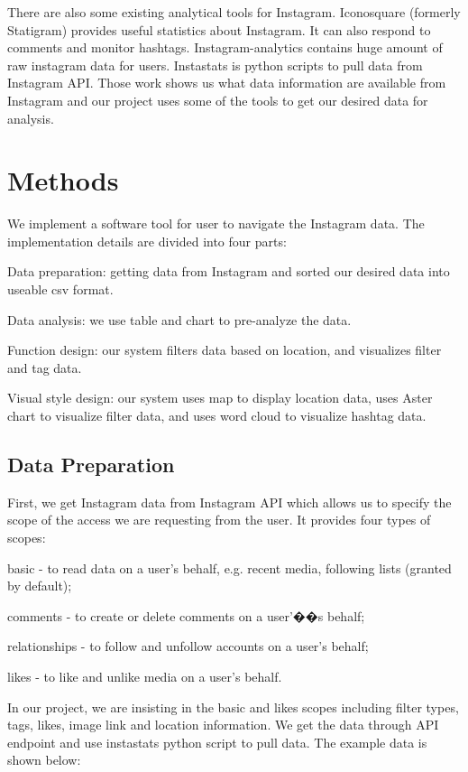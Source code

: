 \documentclass[conference]{acmsiggraph}
\begin{document}
There are also some existing analytical tools for Instagram. Iconosquare (formerly Statigram) \cite{iconosquare} provides useful statistics about Instagram. It can also respond to comments and monitor hashtags. Instagram-analytics \cite{simplymeasured} contains huge amount of raw instagram data for users. Instastats \cite{instastats} is python scripts to pull data from Instagram API. Those work shows us what data information are available from Instagram and our project uses some of the tools to get our desired data for analysis.

\section{Methods}

We implement a software tool for user to navigate the Instagram data. The implementation details are divided into four parts:

Data preparation: getting data from Instagram and sorted our desired data into useable csv format.

Data analysis: we use table and chart to pre-analyze the data.

Function design: our system filters data based on location, and visualizes filter and tag data.

Visual style design: our system uses map to display location data, uses Aster chart to visualize filter data, and uses word cloud to visualize hashtag data.

\subsection{Data Preparation}

First, we get Instagram data from Instagram API which allows us to specify the scope of the access we are requesting from the user. It provides four types of scopes:

basic - to read data on a user's behalf, e.g. recent media, following lists (granted by default);

comments - to create or delete comments on a user'��s behalf;

relationships - to follow and unfollow accounts on a user's behalf;

likes - to like and unlike media on a user's behalf.

In our project, we are insisting in the basic and likes scopes including filter types, tags, likes, image link and location information. We get the data through API endpoint and use instastats python script to pull data. The example data is shown below:
\end{document}
